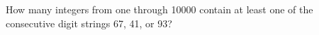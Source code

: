 How many integers from one through 10000 contain at least one of the consecutive digit strings 67, 41, or 93?
